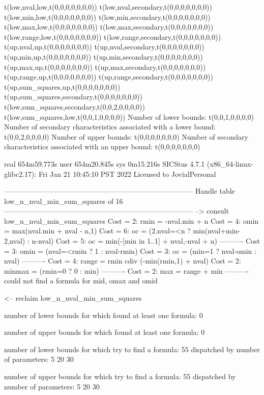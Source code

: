 t(low,nval,low,t(0,0,0,0,0,0,0))
t(low,nval,secondary,t(0,0,0,0,0,0,0))
t(low,min,low,t(0,0,0,0,0,0,0))
t(low,min,secondary,t(0,0,0,0,0,0,0))
t(low,max,low,t(0,0,0,0,0,0,0))
t(low,max,secondary,t(0,0,0,0,0,0,0))
t(low,range,low,t(0,0,0,0,0,0,0))
t(low,range,secondary,t(0,0,0,0,0,0,0))
t(up,nval,up,t(0,0,0,0,0,0,0))
t(up,nval,secondary,t(0,0,0,0,0,0,0))
t(up,min,up,t(0,0,0,0,0,0,0))
t(up,min,secondary,t(0,0,0,0,0,0,0))
t(up,max,up,t(0,0,0,0,0,0,0))
t(up,max,secondary,t(0,0,0,0,0,0,0))
t(up,range,up,t(0,0,0,0,0,0,0))
t(up,range,secondary,t(0,0,0,0,0,0,0))
t(up,sum_squares,up,t(0,0,0,0,0,0,0))
t(up,sum_squares,secondary,t(0,0,0,0,0,0,0))
t(low,sum_squares,secondary,t(0,0,2,0,0,0,0))
t(low,sum_squares,low,t(0,0,1,0,0,0,0))
Number of lower bounds:                                             t(0,0,1,0,0,0,0)
Number of secondary characteristics associated with a lower bound:  t(0,0,2,0,0,0,0)
Number of upper bounds:                                             t(0,0,0,0,0,0,0)
Number of secondary characteristics associated with an upper bound: t(0,0,0,0,0,0,0)

real	654m59.773s
user	654m20.845s
sys	0m15.216s
SICStus 4.7.1 (x86_64-linux-glibc2.17): Fri Jan 21 10:45:10 PST 2022
Licensed to JovialPersonal


--------------------------------------------------------------------------------
Handle table low_n_nval_min_sum_squares of 16
--------------------------------------------------------------------------------
--> consult low_n_nval_min_sum_squares
Cost =  2:  rmin   = -nval.min + n
Cost =  4:  omin   = max(nval.min + nval - n,1)
Cost =  6:  oc     = (2.nval=<n ? min(nval+min-2,nval) : n-nval)
Cost =  5:  oc     = min(-[min in 1..1] + nval,-nval + n)
----------
Cost =  3:  omin   = (nval=<rmin ? 1 : nval-rmin)
Cost =  3:  oc     = (min=1 ? nval-omin : nval)
----------
Cost =  4:  range  = rmin cdiv (-min(rmin,1) + nval)
Cost =  2:  minmax = (rmin=0 ? 0 : min)
----------
Cost =  2:  max    = range + min
----------
could not find a formula for mid, omax and omid

<-- reclaim low_n_nval_min_sum_squares

number of lower bounds for which found at least one formula: 0

number of upper bounds for which found at least one formula: 0

number of lower bounds for which try to find a formula: 55
dispatched by number of parameters: 5  20  30

number of upper bounds for which try to find a formula: 55
dispatched by number of parameters: 5  20  30

